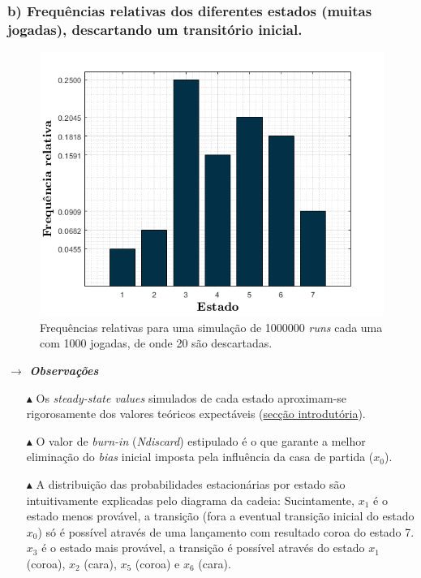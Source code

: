 \subsubsection{b) Frequências relativas dos diferentes estados (muitas jogadas), descartando um transitório inicial.}
\label{subsubsec:P1b}

\vspace{-1em}
\begin{figure}[H]
    \centering
    \includegraphics[width = 0.55\linewidth]{img/P1/P1b.png}
    \caption{Frequências relativas para uma simulação de 1000000 \textit{runs} cada uma com 1000 jogadas, de onde 20 são descartadas.}
    \label{fig:P1b}
\end{figure}

\noindent\textbf{\textit{$\rightarrow$ Observações}}
\begin{itemize}
    \item[$\blacktriangle$] Os \textit{steady-state values} simulados de cada estado aproximam-se rigorosamente dos valores teóricos expectáveis (\hyperref[subsec:intro]{secção introdutória}).
    \item[$\blacktriangle$] O valor de \textit{burn-in} (\textit{Ndiscard}) estipulado é o que garante a melhor eliminação do \textit{bias} inicial imposta pela influência da casa de partida ($x_0$).
    \item[$\blacktriangle$] A distribuição das probabilidades estacionárias por estado são intuitivamente explicadas pelo diagrama da cadeia: Sucintamente, $x_1$ é o estado menos provável, a transição (fora a eventual transição inicial do estado $x_0$) só é possível através de uma lançamento com resultado coroa do estado 7. $x_3$ é o estado mais provável, a transição é possível através do estado $x_1$ (coroa), $x_2$ (cara), $x_5$ (coroa) e $x_6$ (cara).   
\end{itemize}


